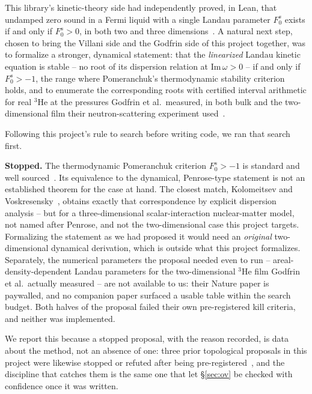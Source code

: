 \documentclass[11pt,a4paper]{article}
\begin{document}
This library's kinetic-theory side had independently proved, in Lean, that undamped zero sound in a
Fermi liquid with a single Landau parameter $F_0^s$ exists if and only if $F_0^s>0$, in both two and
three dimensions~\cite{CallensKinetic}. A natural next step, chosen to bring the Villani side and the
Godfrin side of this project together, was to formalize a stronger, dynamical statement: that the
\emph{linearized} Landau kinetic equation is stable -- no root of its dispersion relation at
$\mathrm{Im}\,\omega>0$ -- if and only if $F_0^s>-1$, the range where Pomeranchuk's thermodynamic
stability criterion holds, and to enumerate the corresponding roots with certified interval arithmetic
for real $^3$He at the pressures Godfrin et al.\ measured, in both bulk and the two-dimensional film
their neutron-scattering experiment used~\cite{Godfrin2012}.

Following this project's rule to search before writing code, we ran that search first.

\begin{failbox}
\textbf{Stopped.} The thermodynamic Pomeranchuk criterion $F_0^s>-1$ is standard and well
sourced~\cite{Pomeranchuk1958}. Its equivalence to the dynamical, Penrose-type statement is not an
established theorem for the case at hand. The closest match,
Kolomeitsev and Voskresensky~\cite{KolomeitsevVoskresensky2016}, obtains exactly that correspondence by
explicit dispersion analysis -- but for a three-dimensional scalar-interaction nuclear-matter model, not
named after Penrose, and not the two-dimensional case this project targets. Formalizing the statement as
we had proposed it would need an \emph{original} two-dimensional dynamical derivation, which is outside
what this project formalizes. Separately, the numerical parameters the proposal needed even to run --
areal-density-dependent Landau parameters for the two-dimensional $^3$He film Godfrin et al.\ actually
measured -- are not available to us: their Nature paper is paywalled, and no companion paper surfaced a
usable table within the search budget. Both halves of the proposal failed their own pre-registered kill
criteria, and neither was implemented.
\end{failbox}

We report this because a stopped proposal, with the reason recorded, is data about the method, not an
absence of one: three prior topological proposals in this project were likewise stopped or refuted after
being pre-registered~\cite{CallensLean}, and the discipline that catches them is the same one that let
\S\ref{sec:ov} be checked with confidence once it was written.
\end{document}
